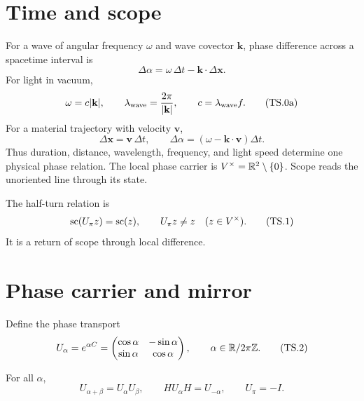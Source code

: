 \documentclass[10pt]{article}
\begin{document}

\begin{abstract}
Time carries local phase through physical distance and duration. Scope reads
the direction of a state through its projective identity. A half-turn changes
every nonzero local state while leaving its projective scope unchanged. The
mirror reverses phase. Linear polarization and a two-level quantum state carry
the same double-angle relation: local phase advances by $\alpha$ while the
scope read advances by $2\alpha$. The field therefore separates local change,
projective return, measurement direction, and time-addressed motion.
\end{abstract}

\section{Time and scope}

For a wave of angular frequency $\omega$ and wave covector $\mathbf k$, phase
difference across a spacetime interval is
\[
\Delta\alpha=\omega\,\Delta t-\mathbf k\cdot\Delta\mathbf x.
\tag{TS.0}
\]
For light in vacuum,
\[
\omega=c|\mathbf k|,
\qquad
\lambda_{\rm wave}=\frac{2\pi}{|\mathbf k|},
\qquad
c=\lambda_{\rm wave}f.
\tag{TS.0a}
\]
For a material trajectory with velocity $\mathbf v$,
\[
\Delta\mathbf x=\mathbf v\,\Delta t,
\qquad
\Delta\alpha=(\omega-\mathbf k\cdot\mathbf v)\Delta t.
\tag{TS.0b}
\]
Thus duration, distance, wavelength, frequency, and light speed determine one
physical phase relation. The local phase carrier is
$V^\times=\mathbb R^2\setminus\{0\}$. Scope reads the unoriented line through its
state.

The half-turn relation is
\[
\operatorname{sc}(U_\pi z)=\operatorname{sc}(z),\qquad U_\pi z\ne z
\quad(z\in V^\times).
\tag{TS.1}
\]
It is a return of scope through local difference.

\section{Phase carrier and mirror}

\sharedroot

Define the phase transport
\[
U_\alpha=e^{\alpha C}
=\begin{pmatrix}\cos\alpha&-\sin\alpha\\
\sin\alpha&\cos\alpha\end{pmatrix},
\qquad \alpha\in\mathbb R/2\pi\mathbb Z.
\tag{TS.2}
\]

\begin{proposition}
For all $\alpha$,
\[
U_{\alpha+\beta}=U_\alpha U_\beta,\qquad
HU_\alpha H=U_{-\alpha},
\qquad U_\pi=-I.
\]
\end{proposition}
\end{document}
